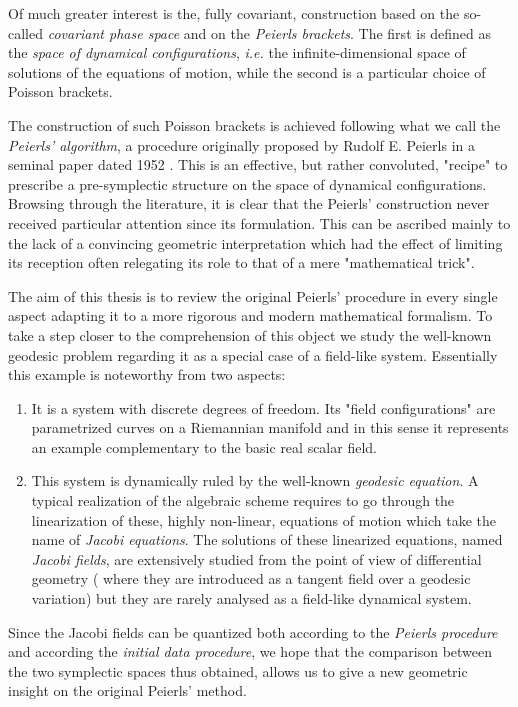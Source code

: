 \documentclass[Main]{subfiles}
\begin{document}
	
Of much greater interest is the, fully covariant, construction based on the so-called \emph{covariant phase space} and on the \emph{Peierls brackets}.
	The first is defined as the \emph{space of dynamical configurations}, \textit{i.e.}  the infinite-dimensional space of solutions of the equations of motion, while the second is a particular choice of Poisson brackets.%
	
	The construction of such Poisson brackets is achieved following what we call the \emph{Peierls' algorithm}, a procedure originally proposed by Rudolf E. Peierls in a seminal paper dated 1952 \cite{Peierls1952}. 
	This is an effective, but rather convoluted, "recipe"  to prescribe a pre-symplectic structure on the space of dynamical configurations. 
	Browsing through the literature, it is clear that the Peierls' construction never received particular attention since its formulation.
This can be ascribed mainly to the lack of a convincing geometric interpretation
which had the effect of limiting its reception often relegating its role to that of a mere  "mathematical trick".

The aim of this thesis is to review the original Peierls' procedure in every single aspect adapting it to a more rigorous and modern mathematical formalism.
To take a step closer to the comprehension of this object we study the well-known geodesic problem regarding it as a special case of a field-like system.
Essentially this example is noteworthy from two aspects:
\begin{enumerate}
	\item It is a system with discrete degrees of freedom. 
	Its "field configurations" are parametrized curves on a Riemannian manifold and in this sense it represents an example complementary to the basic real scalar field.
	\item This system is dynamically ruled by the well-known \emph{geodesic equation}.
		A typical realization of the algebraic scheme requires to go through the linearization of these, highly non-linear, equations of motion which take the name of \emph{Jacobi equations}.
		The solutions of these linearized equations, named  \emph{Jacobi fields}, are extensively studied from the point of view of differential geometry  ( where they are introduced as a tangent field over a geodesic variation) but they are rarely analysed as a field-like dynamical system.
\end{enumerate}
Since the Jacobi fields can be quantized both according to the \emph{Peierls procedure} and according the \emph{initial data procedure},
we hope that the comparison between the two symplectic spaces thus obtained, allows us to give a new geometric insight on the original Peierls' method.
\end{document}
